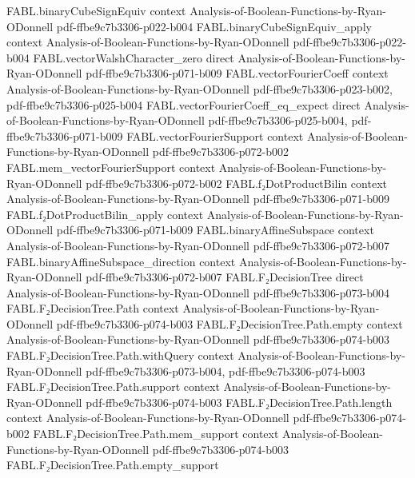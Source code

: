 \begin{theorem}
\proofstep
  {FABL.binaryCubeSignEquiv}
  {context}
  {Analysis-of-Boolean-Functions-by-Ryan-ODonnell}
  {pdf-ffbe9c7b3306-p022-b004}
\proofstep
  {FABL.binaryCubeSignEquiv_apply}
  {context}
  {Analysis-of-Boolean-Functions-by-Ryan-ODonnell}
  {pdf-ffbe9c7b3306-p022-b004}
\proofstep
  {FABL.vectorWalshCharacter_zero}
  {direct}
  {Analysis-of-Boolean-Functions-by-Ryan-ODonnell}
  {pdf-ffbe9c7b3306-p071-b009}
\proofstep
  {FABL.vectorFourierCoeff}
  {context}
  {Analysis-of-Boolean-Functions-by-Ryan-ODonnell}
  {pdf-ffbe9c7b3306-p023-b002,
    pdf-ffbe9c7b3306-p025-b004}
\proofstep
  {FABL.vectorFourierCoeff_eq_expect}
  {direct}
  {Analysis-of-Boolean-Functions-by-Ryan-ODonnell}
  {pdf-ffbe9c7b3306-p025-b004,
    pdf-ffbe9c7b3306-p071-b009}
\proofstep
  {FABL.vectorFourierSupport}
  {context}
  {Analysis-of-Boolean-Functions-by-Ryan-ODonnell}
  {pdf-ffbe9c7b3306-p072-b002}
\proofstep
  {FABL.mem_vectorFourierSupport}
  {context}
  {Analysis-of-Boolean-Functions-by-Ryan-ODonnell}
  {pdf-ffbe9c7b3306-p072-b002}
\proofstep
  {FABL.f₂DotProductBilin}
  {context}
  {Analysis-of-Boolean-Functions-by-Ryan-ODonnell}
  {pdf-ffbe9c7b3306-p071-b009}
\proofstep
  {FABL.f₂DotProductBilin_apply}
  {context}
  {Analysis-of-Boolean-Functions-by-Ryan-ODonnell}
  {pdf-ffbe9c7b3306-p071-b009}
\proofstep
  {FABL.binaryAffineSubspace}
  {context}
  {Analysis-of-Boolean-Functions-by-Ryan-ODonnell}
  {pdf-ffbe9c7b3306-p072-b007}
\proofstep
  {FABL.binaryAffineSubspace_direction}
  {context}
  {Analysis-of-Boolean-Functions-by-Ryan-ODonnell}
  {pdf-ffbe9c7b3306-p072-b007}
\proofstep
  {FABL.F₂DecisionTree}
  {direct}
  {Analysis-of-Boolean-Functions-by-Ryan-ODonnell}
  {pdf-ffbe9c7b3306-p073-b004}
\proofstep
  {FABL.F₂DecisionTree.Path}
  {context}
  {Analysis-of-Boolean-Functions-by-Ryan-ODonnell}
  {pdf-ffbe9c7b3306-p074-b003}
\proofstep
  {FABL.F₂DecisionTree.Path.empty}
  {context}
  {Analysis-of-Boolean-Functions-by-Ryan-ODonnell}
  {pdf-ffbe9c7b3306-p074-b003}
\proofstep
  {FABL.F₂DecisionTree.Path.withQuery}
  {context}
  {Analysis-of-Boolean-Functions-by-Ryan-ODonnell}
  {pdf-ffbe9c7b3306-p073-b004,
    pdf-ffbe9c7b3306-p074-b003}
\proofstep
  {FABL.F₂DecisionTree.Path.support}
  {context}
  {Analysis-of-Boolean-Functions-by-Ryan-ODonnell}
  {pdf-ffbe9c7b3306-p074-b003}
\proofstep
  {FABL.F₂DecisionTree.Path.length}
  {context}
  {Analysis-of-Boolean-Functions-by-Ryan-ODonnell}
  {pdf-ffbe9c7b3306-p074-b002}
\proofstep
  {FABL.F₂DecisionTree.Path.mem_support}
  {context}
  {Analysis-of-Boolean-Functions-by-Ryan-ODonnell}
  {pdf-ffbe9c7b3306-p074-b003}
\proofstep
  {FABL.F₂DecisionTree.Path.empty_support}

\end{theorem}
